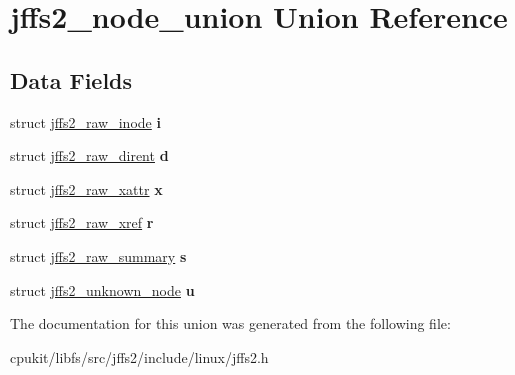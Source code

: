 \hypertarget{unionjffs2__node__union}{}\section{jffs2\+\_\+node\+\_\+union Union Reference}
\label{unionjffs2__node__union}
\subsection*{Data Fields}
\begin{DoxyCompactItemize}
\item 
\mbox{\label{unionjffs2__node__union_a95262eb6114359844cf3ee85e0d7009a}} 
struct \mbox{\hyperlink{structjffs2__raw__inode}{jffs2\+\_\+raw\+\_\+inode}} {\bfseries i}
\item 
\mbox{\label{unionjffs2__node__union_add222d6a2d0a03575a10e2dbf216067f}} 
struct \mbox{\hyperlink{structjffs2__raw__dirent}{jffs2\+\_\+raw\+\_\+dirent}} {\bfseries d}
\item 
\mbox{\label{unionjffs2__node__union_a85a46a1ed3f884421f62bddbd743ffee}} 
struct \mbox{\hyperlink{structjffs2__raw__xattr}{jffs2\+\_\+raw\+\_\+xattr}} {\bfseries x}
\item 
\mbox{\label{unionjffs2__node__union_ade32262341d9ab8d7860def602619c14}} 
struct \mbox{\hyperlink{structjffs2__raw__xref}{jffs2\+\_\+raw\+\_\+xref}} {\bfseries r}
\item 
\mbox{\label{unionjffs2__node__union_a07f3ee9d58396e7b11e1ff57e259483f}} 
struct \mbox{\hyperlink{structjffs2__raw__summary}{jffs2\+\_\+raw\+\_\+summary}} {\bfseries s}
\item 
\mbox{\label{unionjffs2__node__union_a6b81cabaf57a8034195776eaa30b5533}} 
struct \mbox{\hyperlink{structjffs2__unknown__node}{jffs2\+\_\+unknown\+\_\+node}} {\bfseries u}
\end{DoxyCompactItemize}


The documentation for this union was generated from the following file\+:\begin{DoxyCompactItemize}
\item 
cpukit/libfs/src/jffs2/include/linux/jffs2.\+h\end{DoxyCompactItemize}
